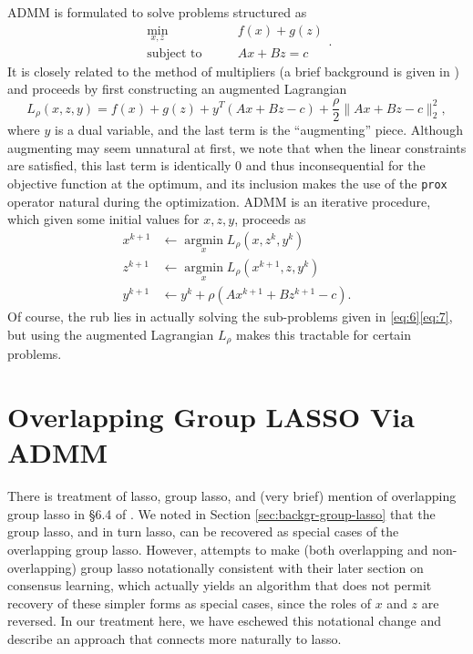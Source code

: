 \documentclass{article}
\begin{document}
ADMM is formulated to solve problems structured as
\begin{equation}
  \begin{aligned}
    \label{eq:4}
    \operatorname*{min}_{x,z} \qquad &f(x) + g(z) \\
    \text{subject to} \qquad&Ax + Bz = c
  \end{aligned}.
\end{equation}
It is closely related to the method of multipliers (a brief background is given in \cite{boyd_distributed_2011}) and proceeds by first constructing an augmented Lagrangian
\begin{equation}
  \label{eq:5}
  L_{\rho}(x,z,y) = f(x) + g(z) + y^T (Ax + Bz - c) + \frac{\rho}{2} \lVert Ax + Bz - c \rVert_2^2,
\end{equation}
where $y$ is a dual variable, and the last term is the ``augmenting'' piece.
Although augmenting may seem unnatural at first, we note that when the linear constraints are satisfied, this last term is identically 0 and thus inconsequential for the objective function at the optimum, and its inclusion makes the use of the \texttt{prox} operator natural during the optimization.
ADMM is an iterative procedure, which given some initial values for $x,z,y$, proceeds as
\begin{align}
  \label{eq:6}
  x^{k+1} &\leftarrow \operatorname*{argmin}_x L_{\rho}(x,z^k,y^k) \\
  \label{eq:7}
  z^{k+1} &\leftarrow \operatorname*{argmin}_x L_{\rho}(x^{k+1},z,y^k) \\
  \label{eq:8}
  y^{k+1} &\leftarrow y^k + \rho(Ax^{k+1} + Bz^{k+1} -c).
\end{align}
Of course, the rub lies in actually solving the sub-problems given in \eqref{eq:6}\eqref{eq:7}, but using the augmented Lagrangian $L_{\rho}$ makes this tractable for certain problems.

\section{Overlapping Group LASSO Via ADMM}
\label{sec:group-lasso-via}
There is treatment of lasso, group lasso, and (very brief) mention of overlapping group lasso in \S 6.4 of \cite{boyd_distributed_2011}.
We noted in Section \ref{sec:backgr-group-lasso} that the group lasso, and in turn lasso, can be recovered as special cases of the overlapping group lasso.
However, \cite{boyd_distributed_2011} attempts to make (both overlapping and non-overlapping) group lasso notationally consistent with their later section on consensus learning, which actually yields an algorithm that does not permit recovery of these simpler forms as special cases, since the roles of $x$ and $z$ are reversed.
In our treatment here, we have eschewed this notational change and describe an approach that connects more naturally to lasso.
\end{document}
